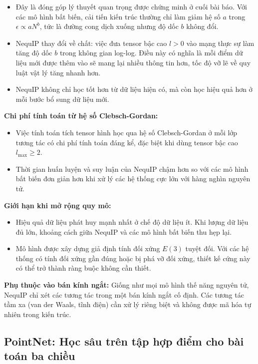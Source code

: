 \begin{itemize}
    \item Đây là đóng góp lý thuyết quan trọng được chứng minh ở cuối bài báo. Với các mô hình bất biến, cải tiến kiến trúc thường chỉ làm giảm hệ số $a$ trong $\epsilon \propto aN^b$, tức là đường cong dịch xuống nhưng độ dốc $b$ không đổi.
    \item NequIP thay đổi về chất: việc đưa tensor bậc cao $l > 0$ vào mạng thực sự làm tăng độ dốc $b$ trong không gian log-log. Điều này có nghĩa là mỗi điểm dữ liệu mới được thêm vào sẽ mang lại nhiều thông tin hơn, tốc độ vỡ lẽ về quy luật vật lý tăng nhanh hơn.
    \item NequIP không chỉ học tốt hơn từ dữ liệu hiện có, mà còn học hiệu quả hơn ở mỗi bước bổ sung dữ liệu mới.
\end{itemize}

\textbf{Chi phí tính toán từ hệ số Clebsch-Gordan:}
\begin{itemize}
    \item Việc tính toán tích tensor hình học qua hệ số Clebsch-Gordan ở mỗi lớp tương tác có chi phí tính toán đáng kể, đặc biệt khi dùng tensor bậc cao $l_{\max} \geq 2$.
    \item Thời gian huấn luyện và suy luận của NequIP chậm hơn so với các mô hình bất biến đơn giản hơn khi xử lý các hệ thống cực lớn với hàng nghìn nguyên tử.
\end{itemize}

\textbf{Giới hạn khi mở rộng quy mô:}
\begin{itemize}
    \item Hiệu quả dữ liệu phát huy mạnh nhất ở chế độ dữ liệu ít. Khi lượng dữ liệu đủ lớn, khoảng cách giữa NequIP và các mô hình bất biến thu hẹp lại.
    \item Mô hình được xây dựng giả định tính đối xứng $E(3)$ tuyệt đối. Với các hệ thống có tính đối xứng gần đúng hoặc bị phá vỡ đối xứng, thiết kế cứng này có thể trở thành ràng buộc không cần thiết.
\end{itemize}

\textbf{Phụ thuộc vào bán kính ngắt:} Giống như mọi mô hình thế năng nguyên tử, NequIP chỉ xét các tương tác trong một bán kính ngắt cố định. Các tương tác tầm xa (van der Waals, tĩnh điện) cần xử lý riêng biệt và không được mã hóa tự nhiên trong kiến trúc.

\subsection{PointNet: Học sâu trên tập hợp điểm cho bài toán ba chiều}
\label{sec:pointnet-paper}

